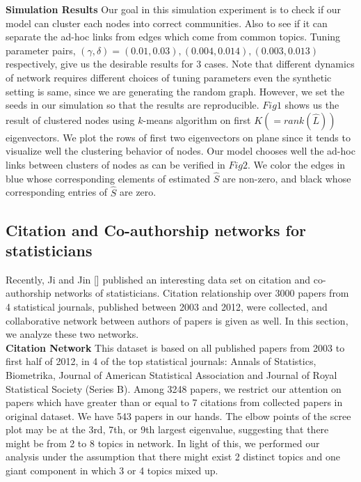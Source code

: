 \documentclass{article}
\begin{document}
\noindent \textbf{Simulation Results} Our goal in this simulation experiment is to check if our model can cluster each nodes into correct communities. Also to see if it can separate the ad-hoc links from edges which come from common topics. Tuning parameter pairs, $(\gamma,\delta) = (0.01,0.03),(0.004,0.014),(0.003,0.013)$ respectively, give us the desirable results for 3 cases. Note that different dynamics of network requires different choices of tuning parameters even the synthetic setting is same, since we are generating the random graph. However, we set the seeds in our simulation so that the results are reproducible. $Fig1$ shows us the result of clustered nodes using $k$-means algorithm on first $K(=rank(\hat{L}))$ eigenvectors. We plot the rows of first two eigenvectors on plane since it tends to visualize well the clustering behavior of nodes. Our model chooses well the ad-hoc links between clusters of nodes as can be verified in $Fig2$. We color the edges in blue whose corresponding elements of estimated $\hat{S}$ are non-zero, and black whose corresponding entries of $\hat{S}$ are zero. 

\subsection{Citation and Co-authorship networks for statisticians }
Recently, Ji and Jin [] published an interesting data set on citation  and co-authorship networks of statisticians. Citation relationship over 3000 papers from 4 statistical journals, published between 2003 and 2012, were collected, and collaborative network between authors of papers is given as well. In this section, we analyze these two networks. \\ 

\noindent\textbf{Citation Network} This dataset is based on all published papers from 2003 to first half of 2012, in 4 of the top statistical journals: Annals of Statistics, Biometrika, Journal of American Statistical Association and Journal of Royal Statistical Society (Series B). Among  3248 papers, we restrict our attention on papers which have greater than or equal to 7 citations from collected papers in original dataset. We have 543 papers in our hands. The elbow points of the scree plot may be at the 3rd, 7th, or 9th largest eigenvalue, suggesting that there might be from 2 to 8 topics in network. In light of this, we performed our analysis under the assumption that there might exist 2 distinct topics and one giant component in which 3 or 4 topics mixed up. \\
\end{document}
